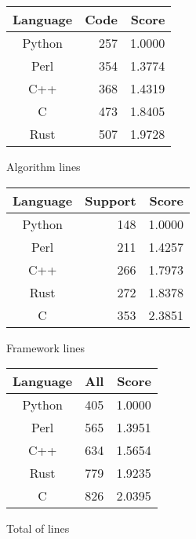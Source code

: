 \begin{subtable}{0.33\textwidth}
    \centering
    \begin{tabular}{|c|r|r|}
        \hline
        Language & Code & Score \\
        \hline
        Python & 257 & 1.0000 \\
        Perl & 354 & 1.3774 \\
        C++ & 368 & 1.4319 \\
        C & 473 & 1.8405 \\
        Rust & 507 & 1.9728 \\
        \hline
    \end{tabular}
    \caption{Algorithm lines}
    \label{table:sloc:algorithm}
\end{subtable}%
\begin{subtable}{0.33\textwidth}
    \centering
    \begin{tabular}{|c|r|r|}
        \hline
        Language & Support & Score \\
        \hline
        Python & 148 & 1.0000 \\
        Perl & 211 & 1.4257 \\
        C++ & 266 & 1.7973 \\
        Rust & 272 & 1.8378 \\
        C & 353 & 2.3851 \\
        \hline
    \end{tabular}
    \caption{Framework lines}
    \label{table:sloc:framework}
\end{subtable}%
\begin{subtable}{0.33\textwidth}
    \centering
    \begin{tabular}{|c|r|r|}
        \hline
        Language & All & Score \\
        \hline
        Python & 405 & 1.0000 \\
        Perl & 565 & 1.3951 \\
        C++ & 634 & 1.5654 \\
        Rust & 779 & 1.9235 \\
        C & 826 & 2.0395 \\
        \hline
    \end{tabular}
    \caption{Total of lines}
    \label{table:sloc:all}
\end{subtable}
